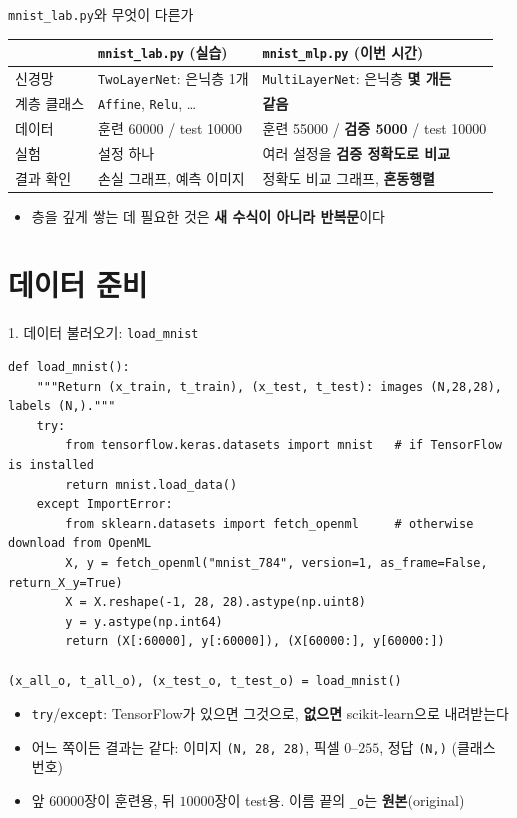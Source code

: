 \documentclass[aspectratio=169,11pt]{beamer}
\newcommand{\code}[1]{\texttt{#1}}
\begin{document}
\begin{frame}{\code{mnist\_lab.py}와 무엇이 다른가}
\centering
\small
\renewcommand{\arraystretch}{1.3}
\begin{tabular}{>{\raggedright}p{3.0cm}>{\raggedright}p{4.8cm}>{\raggedright\arraybackslash}p{5.0cm}}
\toprule
& \textbf{\code{mnist\_lab.py} (실습)} & \textbf{\code{mnist\_mlp.py} (이번 시간)} \\
\midrule
신경망 & \code{TwoLayerNet}: 은닉층 1개 & \code{MultiLayerNet}: 은닉층 \textbf{몇 개든} \\
계층 클래스 & \code{Affine}, \code{Relu}, \ldots & \textbf{같음} \\
데이터 & 훈련 60000 / test 10000 & 훈련 55000 / \textbf{검증 5000} / test 10000 \\
실험 & 설정 하나 & 여러 설정을 \textbf{검증 정확도로 비교} \\
결과 확인 & 손실 그래프, 예측 이미지 & 정확도 비교 그래프, \textbf{혼동행렬} \\
\bottomrule
\end{tabular}
\vskip3mm
\raggedright
\begin{itemize}
\item 층을 깊게 쌓는 데 필요한 것은 \textbf{새 수식이 아니라 반복문}이다
\end{itemize}
\end{frame}

\section{데이터 준비}

\begin{frame}[fragile]{1. 데이터 불러오기: \code{load\_mnist}}
\begin{lstlisting}
def load_mnist():
    """Return (x_train, t_train), (x_test, t_test): images (N,28,28), labels (N,)."""
    try:
        from tensorflow.keras.datasets import mnist   # if TensorFlow is installed
        return mnist.load_data()
    except ImportError:
        from sklearn.datasets import fetch_openml     # otherwise download from OpenML
        X, y = fetch_openml("mnist_784", version=1, as_frame=False, return_X_y=True)
        X = X.reshape(-1, 28, 28).astype(np.uint8)
        y = y.astype(np.int64)
        return (X[:60000], y[:60000]), (X[60000:], y[60000:])

(x_all_o, t_all_o), (x_test_o, t_test_o) = load_mnist()
\end{lstlisting}
\begin{itemize}
\item \code{try}/\code{except}: TensorFlow가 있으면 그것으로, \textbf{없으면} scikit-learn으로 내려받는다
\item 어느 쪽이든 결과는 같다: 이미지 \code{(N, 28, 28)}, 픽셀 $0$--$255$, 정답 \code{(N,)} (클래스 번호)
\item 앞 $60000$장이 훈련용, 뒤 $10000$장이 test용. 이름 끝의 \code{\_o}는 \textbf{원본}(original)
\end{itemize}
\end{frame}
\end{document}

